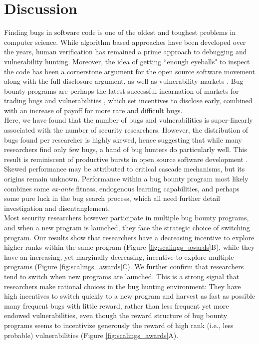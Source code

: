 \section{Discussion}
\label{sec:discussion}
Finding bugs in software code is one of the oldest and toughest problems in computer science. While algorithm based approaches have been developed over the years, human verification has remained a prime approach to debugging and vulnerability hunting. Moreover, the idea of getting ``enough eyeballs" to inspect the code has been a cornerstone argument for the open source software movement \cite{raymond1999cathedral} along with the full-disclosure argument, as well as vulnerability markets \cite{bohme2006comparison}. Bug bounty programs are perhaps the latest successful incarnation of markets for trading bugs and vulnerabilities \cite{bohme2006comparison}, which set incentives to disclose early, combined with an increase of payoff for more rare and difficult bugs.\\

Here, we have found that the number of bugs and vulnerabilities is super-linearly associated with the number of security researchers. However, the distribution of bugs found per researcher is highly skewed, hence suggesting that while many researchers find only few bugs, a hand of bug hunters do particularly well. This result is reminiscent of productive bursts in open source software development \cite{sornette2014much}. Skewed performance may be attributed to critical cascade mechanisms, but its origins remain unknown. Performance within a bug bounty program most likely combines some {\it ex-ante} fitness, endogenous learning capabilities, and perhaps some pure luck in the bug search process, which all need further detail investigation and disentanglement.\\

Most security researchers however participate in multiple bug bounty programs, and when a new program is launched, they face the strategic choice of switching program. Our results show that researchers have a decreasing incentive to explore higher ranks within the same program (Figure \ref{fig:scalings_awards}B), while they have an increasing, yet marginally decreasing, incentive to explore multiple programs (Figure \ref{fig:scalings_awards}C). We further confirm that researchers tend to switch when new programs are launched. This is a strong signal that researchers make rational choices in the bug hunting environment: They have high incentives to switch quickly to a new program and harvest as fast as possible many frequent bugs with little reward, rather than less frequent yet more endowed vulnerabilities, even though the reward structure of bug bounty programs seems to incentivize generously the reward of high rank (i.e., less probable) vulnerabilities (Figure \ref{fig:scalings_awards}A).\\

